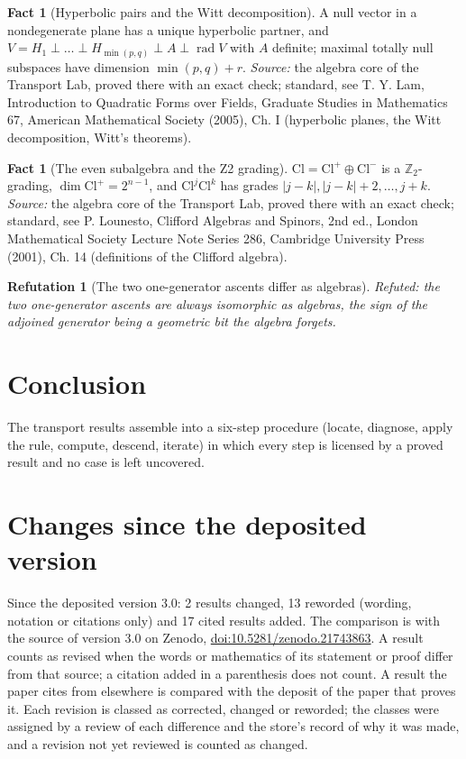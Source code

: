 \documentclass[11pt]{article}
\newtheorem{refutation}[theorem]{Refutation}
\theoremstyle{definition}
\newtheorem{fact}[theorem]{Fact}
\theoremstyle{plain}
\providecommand{\Cl}{}\renewcommand{\Cl}{\mathrm{Cl}}
\begin{document}
\begin{fact}[Hyperbolic pairs and the Witt decomposition]\label{c:std-algebra.witt-decomposition}
A null vector in a nondegenerate plane has a unique hyperbolic partner, and $V = H_1 \perp \dots \perp H_{\min(p,q)} \perp A \perp \operatorname{rad} V$ with $A$ definite; maximal totally null subspaces have dimension $\min(p,q) + r$.
\emph{Source:} the algebra core of the Transport Lab, proved there with an exact check; standard, see T. Y. Lam, Introduction to Quadratic Forms over Fields, Graduate Studies in Mathematics 67, American Mathematical Society (2005), Ch. I (hyperbolic planes, the Witt decomposition, Witt's theorems).
\end{fact}

\begin{fact}[The even subalgebra and the Z2 grading]\label{c:std-algebra.z2-grading}
$\Cl = \Cl^{+} \oplus \Cl^{-}$ is a $\mathbb{Z}_2$-grading, $\dim \Cl^{+} = 2^{n-1}$, and $\Cl^{j}\Cl^{k}$ has grades $|j-k|, |j-k|+2, \dots, j+k$.
\emph{Source:} the algebra core of the Transport Lab, proved there with an exact check; standard, see P. Lounesto, Clifford Algebras and Spinors, 2nd ed., London Mathematical Society Lecture Note Series 286, Cambridge University Press (2001), Ch. 14 (definitions of the Clifford algebra).
\end{fact}

\begin{refutation}[The two one-generator ascents differ as algebras]\label{c:refuted.the-two-one-generator-ascents-differ-as-algebras}
Refuted: the two one-generator ascents are always isomorphic as algebras, the sign of the adjoined generator being a geometric bit the algebra forgets.
\end{refutation}

\section*{Conclusion}
The transport results assemble into a six-step procedure (locate, diagnose, apply the rule, compute, descend, iterate) in which every step is licensed by a proved result and no case is left uncovered.

\section*{Changes since the deposited version}
Since the deposited version 3.0: 2 results changed, 13 reworded (wording, notation or citations only) and 17 cited results added. The comparison is with the source of version 3.0 on Zenodo, \href{https://doi.org/10.5281/zenodo.21743863}{doi:10.5281/zenodo.21743863}. A result counts as revised when the words or mathematics of its statement or proof differ from that source; a citation added in a parenthesis does not count. A result the paper cites from elsewhere is compared with the deposit of the paper that proves it. Each revision is classed as corrected, changed or reworded; the classes were assigned by a review of each difference and the store's record of why it was made, and a revision not yet reviewed is counted as changed.
\end{document}
